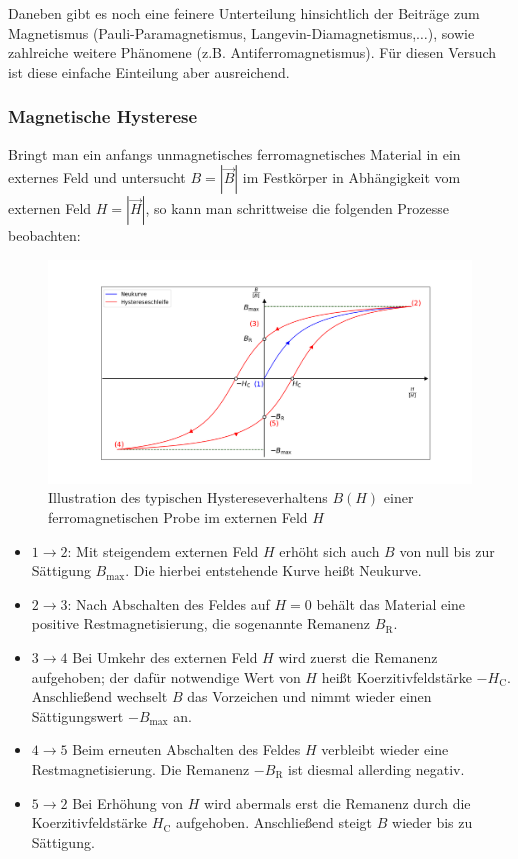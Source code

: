 \documentclass[german,  %
parskip=full,  %
]{scrartcl}
\begin{document}
Daneben gibt es noch eine feinere Unterteilung hinsichtlich der Beiträge zum Magnetismus (Pauli-Paramagnetismus, Langevin-Diamagnetismus,\(\hdots\)), sowie zahlreiche weitere Phänomene (z.B. Antiferromagnetismus). Für diesen Versuch ist diese einfache Einteilung aber ausreichend.
\subsubsection{Magnetische Hysterese}
Bringt man ein anfangs unmagnetisches ferromagnetisches Material in ein externes Feld und untersucht \(B = |\vec{B}|\) im Festkörper in Abhängigkeit vom externen Feld \(H = |\vec{H}|\), so kann man schrittweise die folgenden Prozesse beobachten:
\begin{figure}[h!]\centering
\includegraphics[width=\textwidth]{Hysteresekurve.png}
\caption{Illustration des typischen Hystereseverhaltens \(B(H)\) einer ferromagnetischen Probe im externen Feld \(H\)}
\end{figure}
\newpage
\begin{itemize}
\item \(1\rightarrow 2\): Mit steigendem externen Feld \(H\) erhöht sich auch \(B\) von null bis zur Sättigung \(B_{\mathrm{max}}\). Die hierbei entstehende Kurve heißt Neukurve.
\item \(2\rightarrow 3\): Nach Abschalten des Feldes auf \(H=0\) behält das Material eine positive Restmagnetisierung, die sogenannte Remanenz \(B_{\mathrm{R}}\). 
\item \(3\rightarrow 4\) Bei Umkehr des externen Feld \(H\) wird zuerst die Remanenz aufgehoben; der dafür notwendige Wert von \(H\) heißt Koerzitivfeldstärke \(-H_{\mathrm{C}}\). Anschließend wechselt \(B\) das Vorzeichen und nimmt wieder einen Sättigungswert \(-B_{\mathrm{max}}\) an.
\item \(4\rightarrow 5\) Beim erneuten Abschalten des Feldes \(H\) verbleibt wieder eine Restmagnetisierung. Die Remanenz \(-B_{\mathrm{R}}\) ist diesmal allerding negativ. 
\item \(5\rightarrow 2\) Bei Erhöhung von \(H\) wird abermals erst die Remanenz durch die Koerzitivfeldstärke \(H_{\mathrm{C}}\) aufgehoben. Anschließend steigt \(B\) wieder bis zu Sättigung.
\end{itemize}
\end{document}
